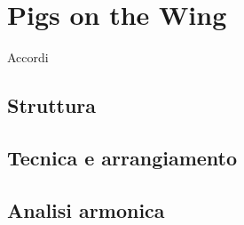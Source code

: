 \documentclass[class=book, crop=false, oneside, 12pt]{standalone}
\begin{document}
    \chapter{Pigs on the Wing}
    
    \begin{sheet}{Accordi}
    \end{sheet}

    \section{Struttura}
    \section{Tecnica e arrangiamento}
    \section{Analisi armonica}
\end{document}
